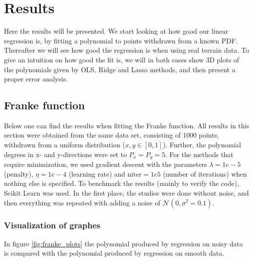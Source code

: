 \section{Results} \label{sec:results}
Here the results will be presented. We start looking at how good our linear regression is, by fitting a polynomial to points withdrawn from a known PDF. Thereafter we will see how good the regression is when using real terrain data. To give an intuition on how good the fit is, we will in both cases show 3D plots of the polynomials given by OLS, Ridge and Lasso methods, and then present a proper error analysis. 

\subsection{Franke function}
Below one can find the results when fitting the Franke function. All results in this section were obtained from the same data set, consisting of 1000 points, withdrawn from a uniform distribution ($x,y\in[0,1]$). Further, the polynomial degrees in x- and y-directions were set to $P_x=P_y=5$. For the methods that require minimization, we used gradient descent with the parameters $\lambda=1e-5$ (penalty), $\eta=1e-4$ (learning rate) and $\text{niter}=1e5$ (number of iterations) when nothing else is specified. To benchmark the results (mainly to verify the code), Scikit Learn was used. In the first place, the studies were done without noise, and then everything was repeated with adding a noise of $\mathcal{N}(0, \sigma^2=0.1)$.

\subsubsection{Visualization of graphes}
In figure \eqref{fig:franke_plots} the polynomial produced by regression on noisy data is compared with the polynomial produced by regression on smooth data. 

